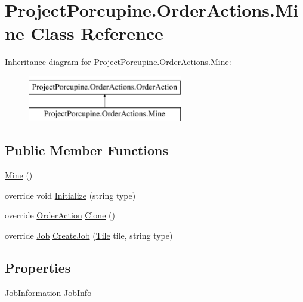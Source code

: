\hypertarget{class_project_porcupine_1_1_order_actions_1_1_mine}{}\section{Project\+Porcupine.\+Order\+Actions.\+Mine Class Reference}
\label{class_project_porcupine_1_1_order_actions_1_1_mine}
Inheritance diagram for Project\+Porcupine.\+Order\+Actions.\+Mine\+:\begin{figure}[H]
\begin{center}
\leavevmode
\includegraphics[height=2.000000cm]{class_project_porcupine_1_1_order_actions_1_1_mine}
\end{center}
\end{figure}
\subsection*{Public Member Functions}
\begin{DoxyCompactItemize}
\item 
\hyperlink{class_project_porcupine_1_1_order_actions_1_1_mine_a591ac35ae1e70e92f5376b804225479e}{Mine} ()
\item 
override void \hyperlink{class_project_porcupine_1_1_order_actions_1_1_mine_a29675aa68437639392e77e821700b24e}{Initialize} (string type)
\item 
override \hyperlink{class_project_porcupine_1_1_order_actions_1_1_order_action}{Order\+Action} \hyperlink{class_project_porcupine_1_1_order_actions_1_1_mine_a8c32c9b50a98edd3db04182f1e3c5b53}{Clone} ()
\item 
override \hyperlink{class_job}{Job} \hyperlink{class_project_porcupine_1_1_order_actions_1_1_mine_a77884a273e799b5203fecbb68884bf13}{Create\+Job} (\hyperlink{class_tile}{Tile} tile, string type)
\end{DoxyCompactItemize}
\subsection*{Properties}
\begin{DoxyCompactItemize}
\item 
\hyperlink{class_project_porcupine_1_1_order_actions_1_1_order_action_1_1_job_information}{Job\+Information} \hyperlink{class_project_porcupine_1_1_order_actions_1_1_mine_acbd914eecee6b3f9cddfed409101cea0}{Job\+Info}
\end{DoxyCompactItemize}
